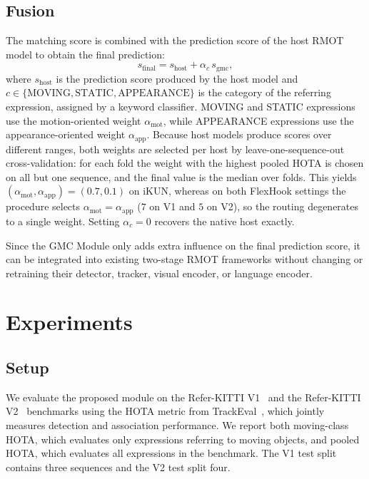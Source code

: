 \documentclass{article}
\begin{document}
\subsection{Fusion}
\label{sec:fusion}
The matching score is combined with the prediction score of the host RMOT model to obtain the final prediction:
\begin{equation}
  s_{\mathrm{final}} = s_{\mathrm{host}} + \alpha_{c}\,s_{\mathrm{gmc}},
  \label{eq:fusion}
\end{equation}
where $s_{\mathrm{host}}$ is the prediction score produced by the host model and $c\in\{\mathrm{MOVING},\mathrm{STATIC},\mathrm{APPEARANCE}\}$ is the category of the referring expression, assigned by a keyword classifier. MOVING and STATIC expressions use the motion-oriented weight $\alpha_{\mathrm{mot}}$, while APPEARANCE expressions use the appearance-oriented weight $\alpha_{\mathrm{app}}$. Because host models produce scores over different ranges, both weights are selected per host by leave-one-sequence-out cross-validation: for each fold the weight with the highest pooled HOTA is chosen on all but one sequence, and the final value is the median over folds. This yields $(\alpha_{\mathrm{mot}},\alpha_{\mathrm{app}})=(0.7,0.1)$ on iKUN, whereas on both FlexHook settings the procedure selects $\alpha_{\mathrm{mot}}=\alpha_{\mathrm{app}}$ ($7$ on V1 and $5$ on V2), so the routing degenerates to a single weight. Setting $\alpha_c=0$ recovers the native host exactly.


Since the GMC Module only adds extra influence on the final prediction score, it can be integrated into existing two-stage RMOT frameworks without changing or retraining their detector, tracker, visual encoder, or language encoder.

\section{Experiments}
\label{sec:exp}

\subsection{Setup}
\label{sec:setup}
We evaluate the proposed module on the Refer-KITTI V1~\cite{transrmot} and the Refer-KITTI V2~\cite{temprmot} benchmarks using the HOTA metric from TrackEval~\cite{hota}, which jointly measures detection and association performance. We report both moving-class HOTA, which evaluates only expressions referring to moving objects, and pooled HOTA, which evaluates all expressions in the benchmark. The V1 test split contains three sequences and the V2 test split four.
\end{document}
